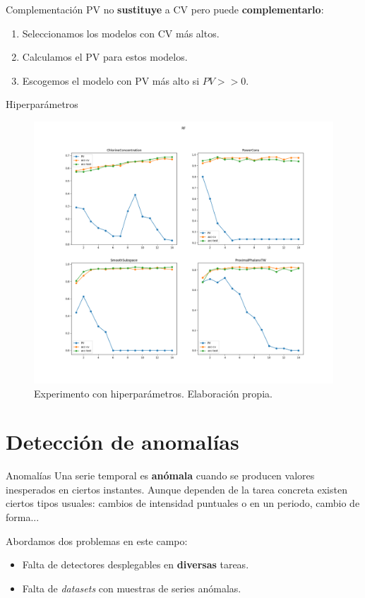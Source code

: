 \documentclass[spanish]{beamer}
\begin{document}
\begin{frame}{Complementación}
  PV no \textbf{sustituye} a CV pero puede \textbf{complementarlo}:
  \begin{enumerate}
    \item Seleccionamos los modelos con CV más altos.
    \item Calculamos el PV para estos modelos.
    \item Escogemos el modelo con PV más alto si $PV >> 0$.
  \end{enumerate}
\end{frame}

\begin{frame}{Hiperparámetros}
  \begin{figure}
    \centering
    \includegraphics[width=.78\textwidth]{img/hiper-RF}
    \caption{Experimento con hiperparámetros. Elaboración propia.}
  \end{figure}
\end{frame}

\section{Detección de anomalías}

\begin{frame}{Anomalías}
  Una serie temporal es \textbf{anómala} cuando se producen valores inesperados en ciertos instantes. \pause Aunque dependen de la tarea concreta existen ciertos tipos usuales: cambios de intensidad puntuales o en un periodo, cambio de forma...
  \pause

  Abordamos dos problemas en este campo:
  \begin{itemize}
    \item Falta de detectores desplegables en \textbf{diversas} tareas.
    \item Falta de \emph{datasets} con muestras de series anómalas.
  \end{itemize}
\end{frame}
\end{document}
